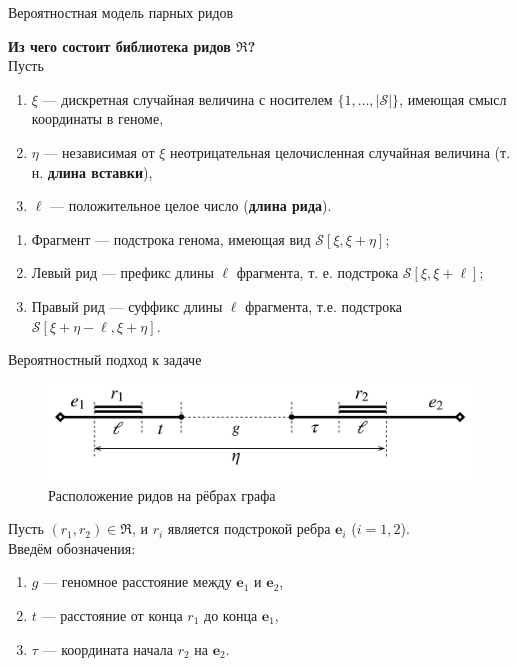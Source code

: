 \documentclass[unicode, notheorems]{beamer}
\begin{document}
\begin{frame}{Вероятностная модель парных ридов}

{\color{blue} \bf Из чего состоит библиотека ридов $\mathfrak{R}$?}\\
\medskip
Пусть
\begin{enumerate}
	\item  $\xi$ --- дискретная случайная величина с носителем $\{ 1, \ldots, |\mathcal{S}|\}$, имеющая смысл координаты в геноме,
	\item $\eta$ --- независимая от $\xi$ неотрицательная целочисленная случайная величина (т. н. \textbf{длина вставки}),
	\item $\ell$ --- положительное целое число (\textbf{длина рида}).
\end{enumerate}
\begin{block}{}
	\begin{enumerate}
		\item Фрагмент --- подстрока генома, имеющая вид $\mathcal{S}[\xi, \xi+\eta]$;
		\item Левый рид --- префикс длины $\ell$ фрагмента, т. е. подстрока  $\mathcal{S}[\xi, \xi+\ell]$;
		\item Правый рид --- суффикс длины $\ell$ фрагмента, т.е. подстрока $\mathcal{S}[\xi+\eta-\ell, \xi+\eta]$.
	\end{enumerate}
\end{block}
\end{frame}

\begin{frame}{Вероятностный подход к задаче}
	\begin{figure}	
		\centering
		\includegraphics[scale=0.05]{img/alignment_shifted}
		\caption{Расположение ридов на рёбрах графа}
	\end{figure}

	Пусть $(r_1, r_2) \in \mathfrak{R}$, и $r_i$ является подстрокой ребра $\mathbf{e}_i$ ($i=1,2$). \\
	\medskip
	Введём обозначения: 
	\begin{enumerate}
		\item $g$ --- геномное расстояние между $\mathbf{e}_1$ и $\mathbf{e}_2$,
		\item $t$ --- расстояние от конца $r_1$ до конца $\mathbf{e}_1$,
		\item $\tau$ --- координата начала $r_2$ на $\mathbf{e}_2$.
	\end{enumerate}
\end{frame}
\end{document}
